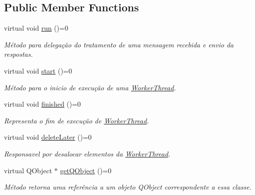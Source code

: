 \subsection*{Public Member Functions}
\begin{DoxyCompactItemize}
\item 
virtual void \hyperlink{classWorkerThread_a008dd6f762a2c20641afbb2a69319ca4}{run} ()=0
\begin{DoxyCompactList}\small\item\em Método para delegação do tratamento de uma mensagem recebida e envio da respostas. \end{DoxyCompactList}\item 
virtual void \hyperlink{classWorkerThread_a4d6d532dfbb27c5a435018ea697acb11}{start} ()=0
\begin{DoxyCompactList}\small\item\em Método para o inicio de execução de uma \hyperlink{classWorkerThread}{Worker\+Thread}. \end{DoxyCompactList}\item 
virtual void \hyperlink{classWorkerThread_a270d44343c31516acebd9544788e3886}{finished} ()=0\hypertarget{classWorkerThread_a270d44343c31516acebd9544788e3886}{}\label{classWorkerThread_a270d44343c31516acebd9544788e3886}

\begin{DoxyCompactList}\small\item\em Representa o fim de execução de \hyperlink{classWorkerThread}{Worker\+Thread}. \end{DoxyCompactList}\item 
virtual void \hyperlink{classWorkerThread_abf55cfb94dd10a2a3b2ff3896473c11b}{delete\+Later} ()=0\hypertarget{classWorkerThread_abf55cfb94dd10a2a3b2ff3896473c11b}{}\label{classWorkerThread_abf55cfb94dd10a2a3b2ff3896473c11b}

\begin{DoxyCompactList}\small\item\em Responsavel por desalocar elementos da \hyperlink{classWorkerThread}{Worker\+Thread}. \end{DoxyCompactList}\item 
virtual Q\+Object $\ast$ \hyperlink{classWorkerThread_a7cce841d4e0b98ebdeb0c7027045dfc4}{get\+Q\+Object} ()=0
\begin{DoxyCompactList}\small\item\em Método retorna uma referência a um objeto Q\+Object correspondente a essa classe. \end{DoxyCompactList}\end{DoxyCompactItemize}


